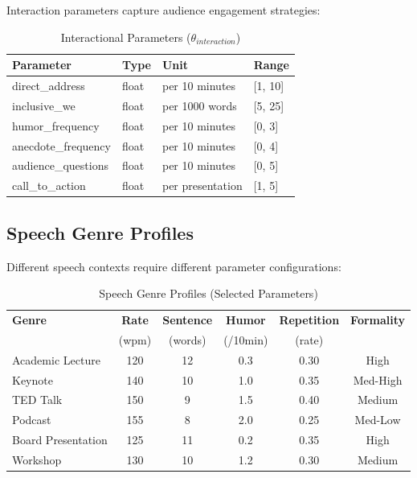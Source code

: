Interaction parameters capture audience engagement strategies:

\begin{table}[h]
\centering
\caption{Interactional Parameters ($\theta_{interaction}$)}
\label{tab:sw-interaction}
\begin{tabular}{llll}
\toprule
\textbf{Parameter} & \textbf{Type} & \textbf{Unit} & \textbf{Range} \\
\midrule
direct\_address & float & per 10 minutes & [1, 10] \\
inclusive\_we & float & per 1000 words & [5, 25] \\
humor\_frequency & float & per 10 minutes & [0, 3] \\
anecdote\_frequency & float & per 10 minutes & [0, 4] \\
audience\_questions & float & per 10 minutes & [0, 5] \\
call\_to\_action & float & per presentation & [1, 5] \\
\bottomrule
\end{tabular}
\end{table}

\subsection{Speech Genre Profiles}
\label{sec:sw-speech-genres}

Different speech contexts require different parameter configurations:

\begin{table}[h]
\centering
\caption{Speech Genre Profiles (Selected Parameters)}
\label{tab:sw-speech-genres}
\begin{tabular}{lccccc}
\toprule
\textbf{Genre} & \textbf{Rate} & \textbf{Sentence} & \textbf{Humor} & \textbf{Repetition} & \textbf{Formality} \\
 & (wpm) & (words) & (/10min) & (rate) & \\
\midrule
Academic Lecture & 120 & 12 & 0.3 & 0.30 & High \\
Keynote & 140 & 10 & 1.0 & 0.35 & Med-High \\
TED Talk & 150 & 9 & 1.5 & 0.40 & Medium \\
Podcast & 155 & 8 & 2.0 & 0.25 & Med-Low \\
Board Presentation & 125 & 11 & 0.2 & 0.35 & High \\
Workshop & 130 & 10 & 1.2 & 0.30 & Medium \\
\bottomrule
\end{tabular}
\end{table}

